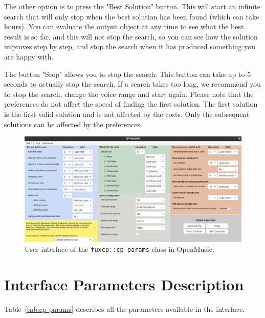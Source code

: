 The other option is to press the "Best Solution" button. This will start an infinite search that will only stop when the best solution has been found (which can take hours). You can evaluate the output object at any time to see what the best result is so far, and this will not stop the search, so you can see how the solution improves step by step, and stop the search when it has produced something you are happy with.

The button "Stop" allows you to stop the search. This button can take up to 5 seconds to actually stop the search. If a search takes too long, we recommend you to stop the search, change the voice range and start again.
Please note that the preferences do not affect the speed of finding the first solution. The first solution is the first valid solution and is not affected by the costs. Only the subsequent solutions can be affected by the preferences.

\begin{figure}
  \centering
  \includegraphics[width=\textheight, height=\textwidth, keepaspectratio]{Images/om_int_interface.png}
  \caption{User interface of the \texttt{fuxcp::cp-params} class in OpenMusic.}
  \label{fig:om_int_interface}
\end{figure}

\section{Interface Parameters Description} \label{appendix:interface-parameters-description}
Table~\ref{tab:cp-params} describes all the parameters available in the interface.

